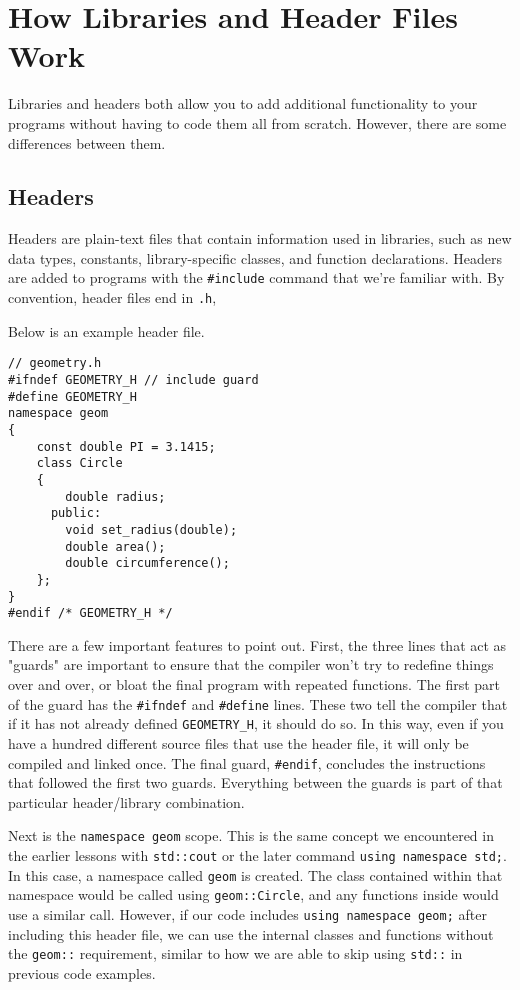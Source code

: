 \section{How Libraries and Header Files Work}
Libraries and headers both allow you to add additional functionality to your programs without having to code them all from scratch. However, there are some differences between them.

\subsection*{Headers}
Headers are plain-text files that contain information used in libraries, such as new data types, constants, library-specific classes, and function declarations.  Headers are added to programs with the \texttt{\#include} command that we're familiar with.  By convention, header files end in \texttt{.h}, 

Below is an example header file.

\begin{verbatim}
// geometry.h
#ifndef GEOMETRY_H // include guard
#define GEOMETRY_H
namespace geom
{
    const double PI = 3.1415;
    class Circle 
    {
        double radius;
      public:
        void set_radius(double);
        double area();
        double circumference();
    };
}
#endif /* GEOMETRY_H */
\end{verbatim}

There are a few important features to point out.  First, the three lines that act as "guards" are important to ensure that the compiler won't try to redefine things over and over, or bloat the final program with repeated functions.  The first part of the guard has the \texttt{\#ifndef} and \texttt{\#define} lines.  These two tell the compiler that if it has not already defined \texttt{GEOMETRY\_H}, it should do so.  In this way, even if you have a hundred different source files that use the header file, it will only be compiled and linked once.  The final guard, \texttt{\#endif}, concludes the instructions that followed the first two guards.  Everything between the guards is part of that particular header/library combination.

Next is the \texttt{namespace geom} scope.  
This is the same concept we encountered in the earlier lessons with \texttt{std::cout} or the later command \texttt{using namespace std;}.  
In this case, a namespace called \texttt{geom} is created.  
The class contained within that namespace would be called using \texttt{geom::Circle}, and any functions inside would use a similar call.  
However, if our code includes \texttt{using namespace geom;} after including this header file, we can use the internal classes and functions without the \texttt{geom::} requirement, similar to how we are able to skip using \texttt{std::} in previous code examples.

